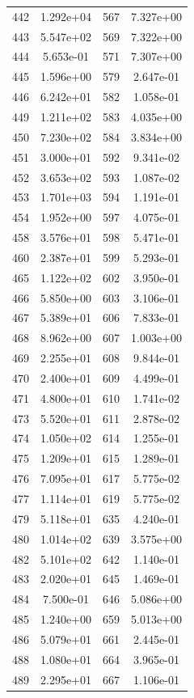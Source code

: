 \documentclass[12pt]{article}
\begin{document}
\begin{longtable}{@{}cccc@{}}
442 & 1.292e+04 & 567 & 7.327e+00 \\
443 & 5.547e+02 & 569 & 7.322e+00 \\
444 & 5.653e-01 & 571 & 7.307e+00 \\
445 & 1.596e+00 & 579 & 2.647e-01 \\
446 & 6.242e+01 & 582 & 1.058e-01 \\
449 & 1.211e+02 & 583 & 4.035e+00 \\
450 & 7.230e+02 & 584 & 3.834e+00 \\
451 & 3.000e+01 & 592 & 9.341e-02 \\
452 & 3.653e+02 & 593 & 1.087e-02 \\
453 & 1.701e+03 & 594 & 1.191e-01 \\
454 & 1.952e+00 & 597 & 4.075e-01 \\
458 & 3.576e+01 & 598 & 5.471e-01 \\
460 & 2.387e+01 & 599 & 5.293e-01 \\
465 & 1.122e+02 & 602 & 3.950e-01 \\
466 & 5.850e+00 & 603 & 3.106e-01 \\
467 & 5.389e+01 & 606 & 7.833e-01 \\
468 & 8.962e+00 & 607 & 1.003e+00 \\
469 & 2.255e+01 & 608 & 9.844e-01 \\
470 & 2.400e+01 & 609 & 4.499e-01 \\
471 & 4.800e+01 & 610 & 1.741e-02 \\
473 & 5.520e+01 & 611 & 2.878e-02 \\
474 & 1.050e+02 & 614 & 1.255e-01 \\
475 & 1.209e+01 & 615 & 1.289e-01 \\
476 & 7.095e+01 & 617 & 5.775e-02 \\
477 & 1.114e+01 & 619 & 5.775e-02 \\
479 & 5.118e+01 & 635 & 4.240e-01 \\
480 & 1.014e+02 & 639 & 3.575e+00 \\
482 & 5.101e+02 & 642 & 1.140e-01 \\
483 & 2.020e+01 & 645 & 1.469e-01 \\
484 & 7.500e-01 & 646 & 5.086e+00 \\
485 & 1.240e+00 & 659 & 5.013e+00 \\
486 & 5.079e+01 & 661 & 2.445e-01 \\
488 & 1.080e+01 & 664 & 3.965e-01 \\
489 & 2.295e+01 & 667 & 1.106e-01 \\

\end{longtable}
\end{document}
